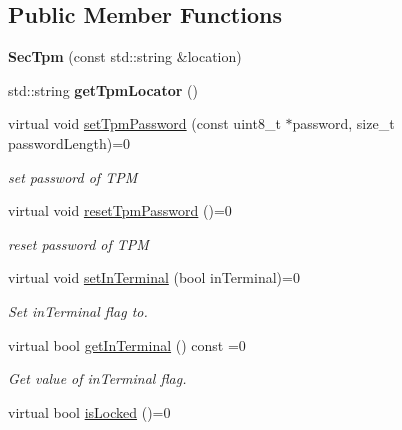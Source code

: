 \subsection*{Public Member Functions}
\begin{DoxyCompactItemize}
\item 
{\bfseries Sec\+Tpm} (const std\+::string \&location)\hypertarget{classndn_1_1SecTpm_a4aef971dcad437de18d29f42a7ec236c}{}\label{classndn_1_1SecTpm_a4aef971dcad437de18d29f42a7ec236c}

\item 
std\+::string {\bfseries get\+Tpm\+Locator} ()\hypertarget{classndn_1_1SecTpm_a4abc992767d95f5b128aab4f53ae53e1}{}\label{classndn_1_1SecTpm_a4abc992767d95f5b128aab4f53ae53e1}

\item 
virtual void \hyperlink{classndn_1_1SecTpm_a991200fc09d012168f5c435c9ac53f2f}{set\+Tpm\+Password} (const uint8\+\_\+t $\ast$password, size\+\_\+t password\+Length)=0
\begin{DoxyCompactList}\small\item\em set password of T\+PM \end{DoxyCompactList}\item 
virtual void \hyperlink{classndn_1_1SecTpm_af971a96c5c9152535c19f4ed7d655b57}{reset\+Tpm\+Password} ()=0\hypertarget{classndn_1_1SecTpm_af971a96c5c9152535c19f4ed7d655b57}{}\label{classndn_1_1SecTpm_af971a96c5c9152535c19f4ed7d655b57}

\begin{DoxyCompactList}\small\item\em reset password of T\+PM \end{DoxyCompactList}\item 
virtual void \hyperlink{classndn_1_1SecTpm_afa42a8279fc065d472606677f4e1553b}{set\+In\+Terminal} (bool in\+Terminal)=0
\begin{DoxyCompactList}\small\item\em Set in\+Terminal flag to. \end{DoxyCompactList}\item 
virtual bool \hyperlink{classndn_1_1SecTpm_ab61bc5c61d80ed9470903d0f747c41e5}{get\+In\+Terminal} () const =0\hypertarget{classndn_1_1SecTpm_ab61bc5c61d80ed9470903d0f747c41e5}{}\label{classndn_1_1SecTpm_ab61bc5c61d80ed9470903d0f747c41e5}

\begin{DoxyCompactList}\small\item\em Get value of in\+Terminal flag. \end{DoxyCompactList}\item 
virtual bool \hyperlink{classndn_1_1SecTpm_a69196126daadb64f99d0ec48e2fde7c9}{is\+Locked} ()=0\hypertarget{classndn_1_1SecTpm_a69196126daadb64f99d0ec48e2fde7c9}{}\label{classndn_1_1SecTpm_a69196126daadb64f99d0ec48e2fde7c9}


\end{DoxyCompactItemize}
